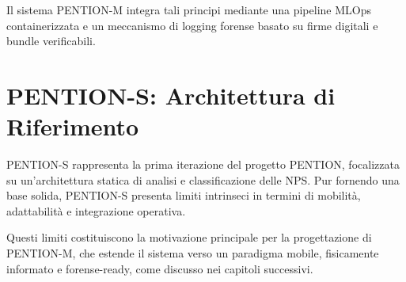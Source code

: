 Il sistema PENTION-M integra tali principi mediante una pipeline MLOps containerizzata e un meccanismo di logging forense basato su firme digitali e bundle verificabili.

\section{PENTION-S: Architettura di Riferimento}
\label{sec:pention_s}

PENTION-S rappresenta la prima iterazione del progetto PENTION, focalizzata su un’architettura statica di analisi e classificazione delle NPS.
Pur fornendo una base solida, PENTION-S presenta limiti intrinseci in termini di mobilità, adattabilità e integrazione operativa.

Questi limiti costituiscono la motivazione principale per la progettazione di PENTION-M, che estende il sistema verso un paradigma mobile, fisicamente informato e forense-ready, come discusso nei capitoli successivi.
